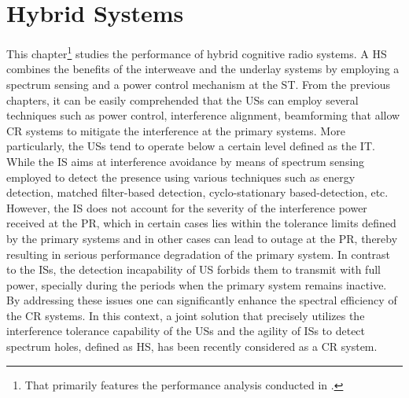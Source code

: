 \chapter{Hybrid Systems} \label{chap:HS}
This chapter\footnote{That primarily features the performance analysis conducted in .} studies the performance of hybrid cognitive radio systems. A HS combines the benefits of the interweave and the underlay systems by employing a spectrum sensing and a power control mechanism at the ST. 
From the previous chapters, it can be easily comprehended that the USs can employ several techniques such as power control, interference alignment, beamforming that allow CR systems to mitigate the interference at the primary systems. More particularly, the USs tend to operate below a certain level defined as the IT. 
While the IS aims at interference avoidance by means of spectrum sensing employed to detect the presence using various techniques such as energy detection, matched filter-based detection, cyclo-stationary based-detection, etc. %
However, the IS does not account for the severity of the interference power received at the PR, which in certain cases lies within the tolerance limits defined by the primary systems and in other cases can lead to outage at the PR, thereby resulting in serious performance degradation of the primary system. In contrast to the ISs, the detection incapability of US forbids them to transmit with full power, specially during the periods when the primary system remains inactive. By addressing these issues one can significantly enhance the spectral efficiency of the CR systems. In this context, a joint solution that precisely utilizes the interference tolerance capability of the USs and the agility of ISs to detect spectrum holes, defined as HS, has been recently considered as a CR system. 



